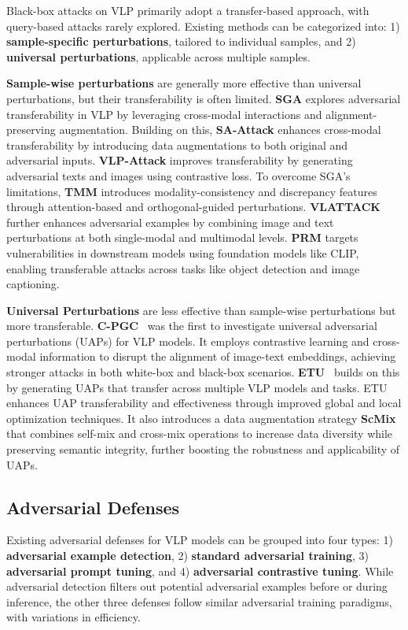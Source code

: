 Black-box attacks on VLP primarily adopt a transfer-based approach, with query-based attacks rarely explored. Existing methods can be categorized into: 1) \textbf{sample-specific perturbations}, tailored to individual samples, and 2) \textbf{universal perturbations}, applicable across multiple samples.

\textbf{Sample-wise perturbations} are generally more effective than universal perturbations, but their transferability is often limited.
\textbf{SGA}\cite{lu2023set} explores adversarial transferability in VLP by leveraging cross-modal interactions and alignment-preserving augmentation. Building on this, \textbf{SA-Attack}\cite{he2023sa} enhances cross-modal transferability by introducing data augmentations to both original and adversarial inputs. \textbf{VLP-Attack}\cite{wang2023exploring} improves transferability by generating adversarial texts and images using contrastive loss. To overcome SGA's limitations, \textbf{TMM}\cite{wang2024transferable} introduces modality-consistency and discrepancy features through attention-based and orthogonal-guided perturbations. \textbf{VLATTACK}\cite{yin2024vlattack} further enhances adversarial examples by combining image and text perturbations at both single-modal and multimodal levels. \textbf{PRM}\cite{hu2024firm} targets vulnerabilities in downstream models using foundation models like CLIP, enabling transferable attacks across tasks like object detection and image captioning.

\textbf{Universal Perturbations} are less effective than sample-wise perturbations but more transferable.
\textbf{C-PGC}~\cite{fang2024one} was the first to investigate universal adversarial perturbations (UAPs) for VLP models. It employs contrastive learning and cross-modal information to disrupt the alignment of image-text embeddings, achieving stronger attacks in both white-box and black-box scenarios.
\textbf{ETU}~\cite{zhang2024universal} builds on this by generating UAPs that transfer across multiple VLP models and tasks. ETU enhances UAP transferability and effectiveness through improved global and local optimization techniques. It also introduces a data augmentation strategy \textbf{ScMix} that combines self-mix and cross-mix operations to increase data diversity while preserving semantic integrity, further boosting the robustness and applicability of UAPs.


\subsection{Adversarial Defenses}
\label{sec:vlp-defenses}
Existing adversarial defenses for VLP models can be grouped into four types: 1) \textbf{adversarial example detection}, 2) \textbf{standard adversarial training}, 3) \textbf{adversarial prompt tuning}, and 4) \textbf{adversarial contrastive tuning}. While adversarial detection filters out potential adversarial examples before or during inference, the other three defenses follow similar adversarial training paradigms, with variations in efficiency.


